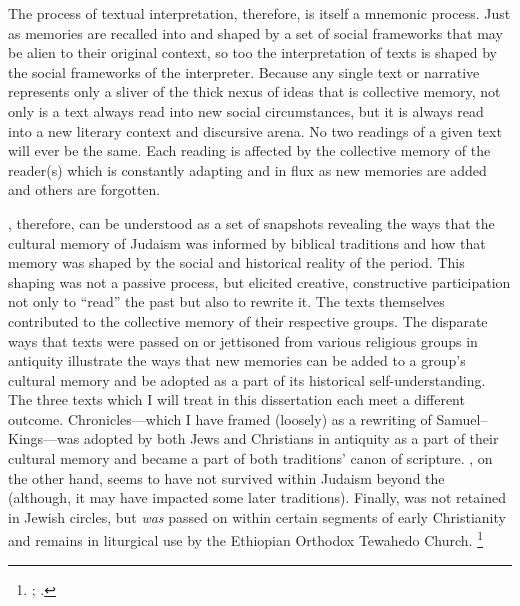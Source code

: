 The process of textual interpretation, therefore, is itself a mnemonic process. Just as memories are recalled into and shaped by a set of social frameworks that may be alien to their original context, so too the interpretation of texts is shaped by the social frameworks of the interpreter. Because any single text or narrative represents only a sliver of the thick nexus of ideas that is collective memory, not only is a text always read into new social circumstances, but it is always read into a new literary context and discursive arena. No two readings of a given text will ever be the same. Each reading is affected by the collective memory of the reader(s) which is constantly adapting and in flux as new memories are added and others are forgotten.  

\rwb, therefore, can be understood as a set of snapshots revealing the ways that the cultural memory of \secondtemple Judaism was informed by biblical traditions and how that memory was shaped by the social and historical reality of the \secondtemple period. This shaping was not a passive process, but elicited creative, constructive participation not only to ``read'' the past but also to rewrite it. The texts themselves contributed to the collective memory of their respective groups. The disparate ways that \rwb texts were passed on or jettisoned from various religious groups in antiquity illustrate the ways that new memories can be added to a group's cultural memory and be adopted as a part of its historical self-understanding. The three texts which I will treat in this dissertation each meet a different outcome. Chronicles---which I have framed (loosely) as a rewriting of Samuel--Kings---was adopted by both Jews and Christians in antiquity as a part of their cultural memory and became a part of both traditions' canon of scripture. \GA, on the other hand, seems to have not survived within Judaism beyond the  (although, it may have impacted some later traditions). Finally, \jub was not retained in Jewish circles, but \emph{was} passed on within certain segments of early Christianity and remains in liturgical use by the Ethiopian Orthodox Tewahedo Church.%
    \footnote{%
        \Cite{baynes_mason-etal2012};
        \cite{asale_bt2016}.}

